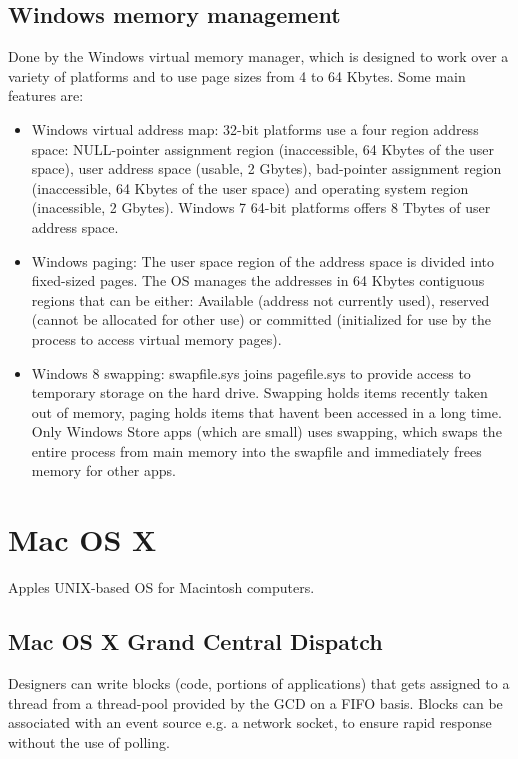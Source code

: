 \subsection{Windows memory management}
Done by the Windows virtual memory manager, which is designed to work over a variety of platforms and to use page sizes from 4 to 64 Kbytes. Some main features are:
\begin{itemize}
    \item Windows virtual address map: 32-bit platforms use a four region address space: NULL-pointer assignment region (inaccessible, 64 Kbytes of the user space), user address space (usable, 2 Gbytes), bad-pointer assignment region (inaccessible, 64 Kbytes of the user space) and operating system region (inacessible, 2 Gbytes). Windows 7 64-bit platforms offers 8 Tbytes of user address space.
    \item Windows paging: The user space region of the address space is divided into fixed-sized pages. The OS manages the addresses in 64 Kbytes contiguous regions that can be either: Available (address not currently used), reserved (cannot be allocated for other use) or committed (initialized for use by the process to access virtual memory pages).
    \item Windows 8 swapping: swapfile.sys joins pagefile.sys to provide access to temporary storage on the hard drive. Swapping holds items recently taken out of memory, paging holds items that havent been accessed in a long time. Only Windows Store apps (which are small) uses swapping, which swaps the entire process from main memory into the swapfile and immediately frees memory for other apps.
\end{itemize}

\section{Mac OS X}
Apples UNIX-based OS for Macintosh computers.

\subsection{Mac OS X Grand Central Dispatch}
Designers can write blocks (code, portions of applications) that gets assigned to a thread from a thread-pool provided by the GCD on a FIFO basis. Blocks can be associated with an event source e.g. a network socket, to ensure rapid response without the use of polling.

